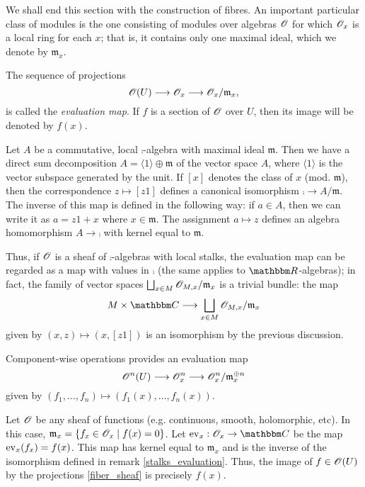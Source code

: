 We shall end this section with the construction of fibres. An important particular class of modules is the one consisting of modules over algebras $\mathscr{O}$ for which $\mathscr{O}_x$ is a local ring for each $x$; that is, it contains only one maximal ideal, which we denote by $\mathfrak{m}_x$.

\begin{defi}
The sequence of projections
\begin{equation}\label{fiber_sheaf}
\mathscr{O}(U)\longrightarrow \mathscr{O}_x\longrightarrow \mathscr{O}_x/\mathfrak{m}_x,
\end{equation}
is called the \emph{evaluation map}. If $f$ is a section of $\mathscr{O}$ over $U$, then its image will be denoted by $f(x)$.
\end{defi}

\begin{obs}\label{stalks_evaluation}
Let $A$ be a commutative, local $\comp$-algebra with maximal ideal $\mathfrak{m}$. Then we have a direct sum decomposition $A=\langle 1 \rangle \oplus \mathfrak{m}$ of the vector space $A$, where $\langle 1 \rangle$ is the vector subspace generated by the unit. If $[x]$ denotes the class of $x$ (mod. $\mathfrak{m}$), then the correspondence $z\mapsto [z1]$ defines a canonical isomorphism $\comp \to A/\mathfrak{m}$. The inverse of this map is defined in the following way: if $a\in A$, then we can write it as $a=z1+x$ where $x\in \mathfrak{m}$. The assignment $a\mapsto z$ defines an algebra homomorphism $A\to \comp$ with kernel equal to $\mathfrak{m}$.

Thus, if $\mathscr{O}$ is a sheaf of $\comp$-algebras with local stalks, the evaluation map can be regarded as a map with values in $\comp$ (the same applies to $\re$-algebras); in fact, the family of vector spaces $\bigsqcup_{x\in M}\mathscr{O}_{M,x}/\mathfrak{m}_x$ is a trivial bundle: the map
$$M\times \comp \longrightarrow \bigsqcup_{x\in M}\scr{O}_{M,x}/\mathfrak{m}_x$$
given by $(x,z)\mapsto (x,[z1])$ is an isomorphism by the previous discussion.
\end{obs}

Component-wise operations provides an evaluation map
$$\mathscr{O}^n(U)\longrightarrow \mathscr{O}^n_x\longrightarrow \mathscr{O}^n_x/\mathfrak{m}_x^{\oplus n}$$
given by $(f_1,\dots ,f_n)\mapsto (f_1(x),\dots ,f_n(x))$.

\begin{ej}
Let $\mathscr{O}$ be any sheaf of functions (e.g. continuous, smooth, holomorphic, etc). In this case, $\mathfrak{m}_x=\{f_x\in \mathscr{O}_x\; | \; f(x)=0\}$. Let $\opnm{ev}_x :\scr{O}_x\to \comp$ be the map $\operatorname{ev}_x (f_x)=f(x)$. This map has kernel equal to $\mathfrak{m}_x$ and is the inverse of the isomorphism defined in remark \ref{stalks_evaluation}. Thus, the image of $f\in \mathscr{O}(U)$ by the projections \eqref{fiber_sheaf} is precisely $f(x)$.
\end{ej}


